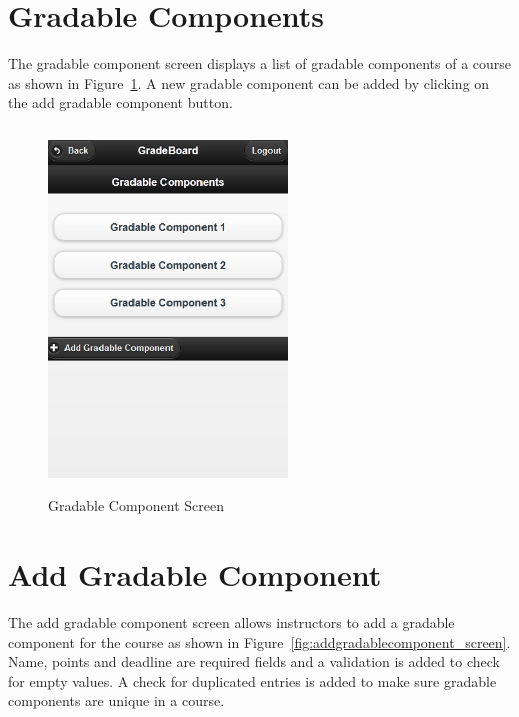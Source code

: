 \newpage
\section{Gradable Components}
The gradable component screen displays a list of gradable components of a course as shown in Figure~\ref{fig:gradablecomponents_screen}. A new gradable component can be added by clicking on the add gradable component button.

\vspace{3em}
\begin{figure}[H]
\begin{center}
\includegraphics[height=3.8in,width=2.5in]{images/gradablecomponents_screen.jpg}
\caption{Gradable Component Screen}
\label{fig:gradablecomponents_screen}
\end{center}
\end{figure}

\newpage
\section{Add Gradable Component}
The add gradable component screen allows instructors to add a gradable component for the course as shown in Figure~\ref{fig:addgradablecomponent_screen}. Name, points and deadline are required fields and a validation is added to check for empty values. A check for duplicated entries is added to make sure gradable components are unique in a course.

